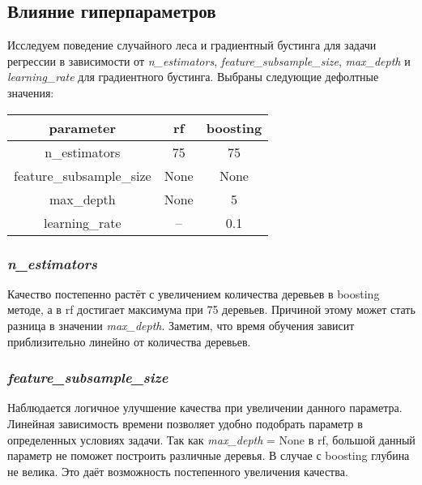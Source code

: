 \documentclass[12pt,fleqn]{article}
\begin{document}
\subsection{Влияние гиперпараметров}
Исследуем поведение случайного леса и градиентный бустинга для задачи регрессии в зависимости от \emph{n\_estimators}, \emph{feature\_subsample\_size}, \emph{max\_depth} и \emph{learning\_rate} для градиентного бустинга. Выбраны следующие дефолтные значения:

\begin{center}
\begin{tabular}{|c|c|c|}
\hline parameter & rf & boosting  \\
\hline n\_estimators & 75 & 75 \\
\hline feature\_subsample\_size & None & None \\
\hline max\_depth & None & 5 \\
\hline learning\_rate & -- & 0.1 \\
\hline
\end{tabular}
\end{center}

\subsubsection{\emph{n\_estimators}}
\begin{figure}[h]
    \centering
\end{figure}
Качество постепенно растёт с увеличением количества деревьев в boosting методе, а в rf достигает максимума при 75 деревьев. Причиной этому может стать разница в значении \emph{max\_depth}. Заметим, что время обучения зависит приблизительно линейно от количества деревьев. 
\newpage

\subsubsection{\emph{feature\_subsample\_size}}
\begin{figure}[h]
    \centering
\end{figure}

Наблюдается логичное улучшение качества при увеличении данного параметра. Линейная зависимость времени позволяет удобно подобрать параметр в определенных условиях задачи. Так как \emph{max\_depth} = None в rf, большой данный параметр не поможет построить различные деревья. В случае с boosting глубина не велика. Это даёт возможность постепенного увеличения качества.
\end{document}
